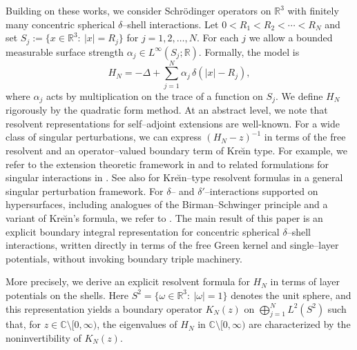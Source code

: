 \documentclass[a4paper,11pt]{article}
\numberwithin{equation}{section}
\theoremstyle{definition}
\theoremstyle{remark}
\begin{document}
Building on these works, we consider Schr\"odinger operators on $\mathbb R^3$
with finitely many concentric spherical $\delta$--shell interactions.
Let $0<R_1<R_2<\cdots<R_N$ and set
$S_j:=\{x\in\mathbb R^3:\ |x|=R_j\}$ for $j=1, 2,\ldots, N$.
For each $j$ we allow a bounded measurable surface strength
$\alpha_j\in L^\infty(S_j;\mathbb R)$.
Formally, the model is
\begin{equation}\label{eq:N-shell}
H_N
=
-\Delta
+
\sum_{j=1}^{N}\alpha_j\,\delta(|x|-R_j),
\end{equation}
where $\alpha_j$ acts by multiplication on the trace of a function on $S_j$.
We define $H_N$ rigorously by the quadratic form method.
At an abstract level, we note that resolvent representations for self--adjoint extensions are well-known.
For a wide class of singular perturbations, we can express $(H_N - z)^{-1}$ in terms of the free resolvent and an operator--valued boundary term of Kre\u{\i}n type.
For example, we refer to the extension theoretic framework in \cite{AGHH} and to related formulations for singular interactions in \cite{BrascheExnerKuperinSeba1994}.
See also \cite{Posilicano2001} for Kre\u{\i}n--type resolvent formulas in a general
singular perturbation framework.
For $\delta$-- and $\delta'$--interactions supported on hypersurfaces, including
analogues of the Birman--Schwinger principle and a variant of Kre\u{\i}n's formula,
we refer to \cite{BehrndtLangerLotoreichik2013}.
The main result of this paper is an explicit boundary integral representation 
for concentric spherical $\delta$--shell interactions, 
written directly in terms of the free Green kernel and single--layer potentials, 
without invoking boundary triple machinery. 

More precisely, we derive an explicit resolvent formula for $H_N$ in terms of
layer potentials on the shells.
Here $S^2=\{\omega\in\mathbb R^3:\ |\omega|=1\}$ denotes the unit sphere, and
this representation yields a boundary operator $K_N(z)$ on
$\bigoplus_{j=1}^N L^2(S^2)$
such that, for $z\in\mathbb C\setminus[0,\infty)$,
the eigenvalues of $H_N$ in $\mathbb C\setminus[0,\infty)$ are characterized by
the noninvertibility of $K_N(z)$.
\end{document}
